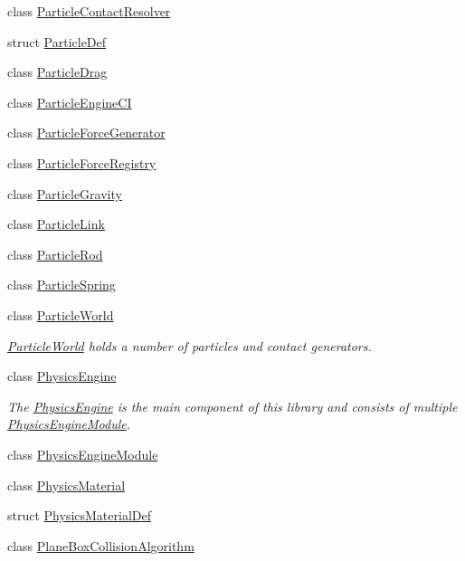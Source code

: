 \begin{DoxyCompactItemize}
\item 
class \mbox{\hyperlink{classr3_1_1_particle_contact_resolver}{Particle\+Contact\+Resolver}}
\item 
struct \mbox{\hyperlink{structr3_1_1_particle_def}{Particle\+Def}}
\item 
class \mbox{\hyperlink{classr3_1_1_particle_drag}{Particle\+Drag}}
\item 
class \mbox{\hyperlink{classr3_1_1_particle_engine_c_i}{Particle\+Engine\+CI}}
\item 
class \mbox{\hyperlink{classr3_1_1_particle_force_generator}{Particle\+Force\+Generator}}
\item 
class \mbox{\hyperlink{classr3_1_1_particle_force_registry}{Particle\+Force\+Registry}}
\item 
class \mbox{\hyperlink{classr3_1_1_particle_gravity}{Particle\+Gravity}}
\item 
class \mbox{\hyperlink{classr3_1_1_particle_link}{Particle\+Link}}
\item 
class \mbox{\hyperlink{classr3_1_1_particle_rod}{Particle\+Rod}}
\item 
class \mbox{\hyperlink{classr3_1_1_particle_spring}{Particle\+Spring}}
\item 
class \mbox{\hyperlink{classr3_1_1_particle_world}{Particle\+World}}
\begin{DoxyCompactList}\small\item\em \mbox{\hyperlink{classr3_1_1_particle_world}{Particle\+World}} holds a number of particles and contact generators. \end{DoxyCompactList}\item 
class \mbox{\hyperlink{classr3_1_1_physics_engine}{Physics\+Engine}}
\begin{DoxyCompactList}\small\item\em The \mbox{\hyperlink{classr3_1_1_physics_engine}{Physics\+Engine}} is the main component of this library and consists of multiple \mbox{\hyperlink{classr3_1_1_physics_engine_module}{Physics\+Engine\+Module}}. \end{DoxyCompactList}\item 
class \mbox{\hyperlink{classr3_1_1_physics_engine_module}{Physics\+Engine\+Module}}
\item 
class \mbox{\hyperlink{classr3_1_1_physics_material}{Physics\+Material}}
\item 
struct \mbox{\hyperlink{structr3_1_1_physics_material_def}{Physics\+Material\+Def}}
\item 
class \mbox{\hyperlink{classr3_1_1_plane_box_collision_algorithm}{Plane\+Box\+Collision\+Algorithm}}

\end{DoxyCompactItemize}
